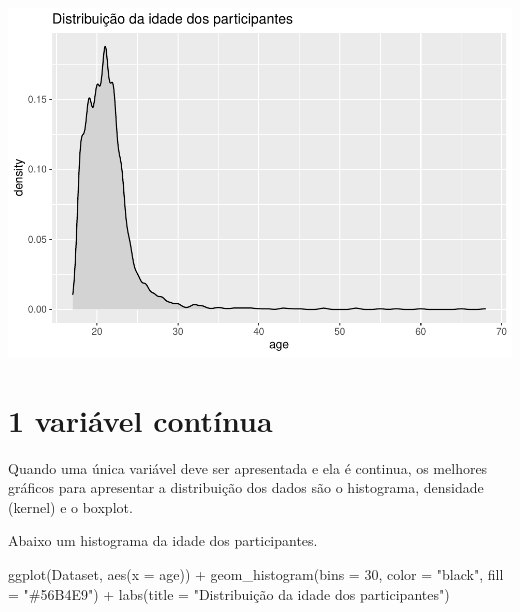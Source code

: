 \documentclass[
]{book}
\newenvironment{Shaded}{\begin{snugshade}}{\end{snugshade}}
\newcommand{\AttributeTok}[1]{\textcolor[rgb]{0.77,0.63,0.00}{#1}}
\newcommand{\DecValTok}[1]{\textcolor[rgb]{0.00,0.00,0.81}{#1}}
\newcommand{\FunctionTok}[1]{\textcolor[rgb]{0.00,0.00,0.00}{#1}}
\newcommand{\NormalTok}[1]{#1}
\newcommand{\SpecialCharTok}[1]{\textcolor[rgb]{0.00,0.00,0.00}{#1}}
\newcommand{\StringTok}[1]{\textcolor[rgb]{0.31,0.60,0.02}{#1}}
\begin{document}
\begin{center}\includegraphics{gitbook-demo_files/figure-latex/unnamed-chunk-17-1} \end{center}

\hypertarget{variuxe1vel-contuxednua}{%
\section{1 variável contínua}\label{variuxe1vel-contuxednua}}

Quando uma única variável deve ser apresentada e ela é continua, os melhores gráficos para apresentar a distribuição dos dados são o histograma, densidade (kernel) e o boxplot.

Abaixo um histograma da idade dos participantes.

\begin{Shaded}
\begin{Highlighting}[]
\FunctionTok{ggplot}\NormalTok{(Dataset, }\FunctionTok{aes}\NormalTok{(}\AttributeTok{x =}\NormalTok{ age)) }\SpecialCharTok{+}
  \FunctionTok{geom\_histogram}\NormalTok{(}\AttributeTok{bins =} \DecValTok{30}\NormalTok{, }\AttributeTok{color =} \StringTok{"black"}\NormalTok{, }\AttributeTok{fill =} \StringTok{"\#56B4E9"}\NormalTok{) }\SpecialCharTok{+}
  \FunctionTok{labs}\NormalTok{(}\AttributeTok{title =} \StringTok{"Distribuição da idade dos participantes"}\NormalTok{)}
\end{Highlighting}
\end{Shaded}
\end{document}
